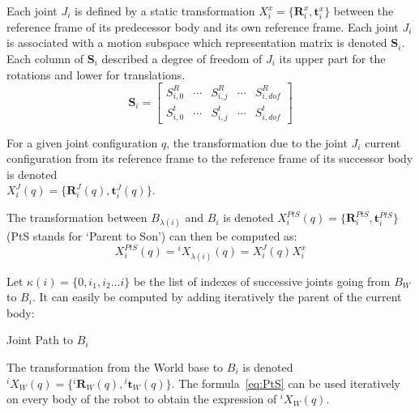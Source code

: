 Each joint $J_i$ is defined by a static transformation $X^x_i = \{\mathbf{R}^x_i, \mathbf{t}^x_i\}$ between the reference frame of its predecessor body and its own reference frame.
Each joint $J_i$ is associated with a motion subspace which representation matrix is denoted $\mathbf{S}_i$. Each column of $\mathbf{S}_i$ described a degree of freedom of $J_i$ its upper part for the rotations and lower for translations.
\begin{equation}
  \mathbf{S}_i =
  \begin{bmatrix}
    S^R_{i,0} & \cdots &
    S^R_{i,j} & \cdots &
    S^R_{i,dof} \\
    S^t_{i,0} & \cdots &
    S^t_{i,j} & \cdots &
    S^t_{i,dof}
  \end{bmatrix}
\end{equation}

For a given joint configuration $q$, the transformation due to the joint $J_i$ current configuration from its reference frame to the reference frame of its successor body is denoted \\$X^J_i (q) = \{\mathbf{R}^J_i (q), \mathbf{t}^J_i (q)\}$.

The transformation between $B_{\lambda(i)}$ and $B_i$ is denoted $X^{PtS}_i (q) = \{\mathbf{R}^{PtS}_i, \mathbf{t}^{PtS}_i\}$ (PtS stands for `Parent to Son') can then be computed as:
\begin{equation}
  {X}^{PtS}_i (q) = {}^{i}X_{\lambda (i)} (q) = X^J_i (q) X^x_i
  \label{eq:PtS}
\end{equation}

Let $\kappa (i) =\{0, i_1, i_2 \ldots i\}$ be the list of indexes of successive joints going from $B_W$ to $B_i$.
It can easily be computed by adding iteratively the parent of the current body:

\begin{algorithm}
  \caption{Joint Path to $B_i$}
\label{JP}
\begin{algorithmic}
  \EndWhile{}
\end{algorithmic}
\end{algorithm}

The transformation from the World base to $B_i$ is denoted \\ ${}^i X_W (q) = \{{}^i \mathbf{R}_W (q), {}^i \mathbf{t}_W (q)\}$.
The formula~\ref{eq:PtS} can be used iteratively on every body of the robot to obtain the expression of ${}^i X_W (q)$.

